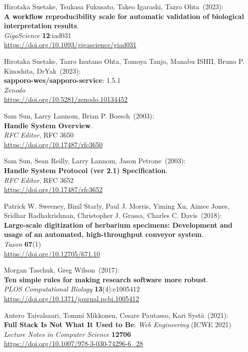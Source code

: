 \begin{thebibliography}{9}
Hirotaka Suetake, Tsukasa Fukusato, Takeo Igarashi, Tazro Ohta~(2023): \\
\textbf{A workflow reproducibility scale for automatic validation of biological interpretation results}.\\
\emph{GigaScience} \textbf{12}:iad031\\
\url{https://doi.org/10.1093/gigascience/giad031}

Hirotaka Suetake, Tazro Inutano Ohta, Tomoya Tanjo, Manabu ISHII, Bruno P. Kinoshita, DrYak~(2023): \\
\textbf{sapporo-wes/sapporo-service}: 1.5.1\\
\emph{Zenodo}\\
\url{https://doi.org/10.5281/zenodo.10134452}


Sam Sun, Larry Lannom, Brian P. Boesch~(2003): \\
\textbf{Handle System Overview}.\\
\emph{RFC Editor}, RFC 3650\\
\url{https://doi.org/10.17487/rfc3650}

Sam Sun, Sean Reilly, Larry Lannom, Jason Petrone~(2003): \\
\textbf{Handle System Protocol (ver 2.1) Specification}.\\
\emph{RFC Editor}, RFC 3652\\
\url{https://doi.org/10.17487/rfc3652}

Patrick W. Sweeney, Binil Starly, Paul J. Morris, Yiming Xu, Aimee Jones, Sridhar Radhakrishnan, Christopher J. Grassa, Charles C. Davis~(2018): \\
\textbf{Large-scale digitization of herbarium specimens: Development and usage of an
automated, high-throughput conveyor system}.\\
\emph{Taxon} \textbf{67}(1)\\
\url{https://doi.org/10.12705/671.10}

Morgan Taschuk, Greg Wilson~(2017):\\
\textbf{Ten simple rules for making research software more robust}.\\
\emph{PLOS Computational Biology} \textbf{13}(4):e1005412\\
\url{https://doi.org/10.1371/journal.pcbi.1005412}

Antero Taivalsaari, Tommi Mikkonen, Cesare Pautasso, Kari Systä~(2021): \\
\textbf{Full Stack Is Not What It Used to Be}.
\emph{Web Engineering} (ICWE 2021)\\
\emph{Lecture Notes in Computer Science} \textbf{12706} \\
\url{https://doi.org/10.1007/978-3-030-74296-6_28}


\end{thebibliography}
